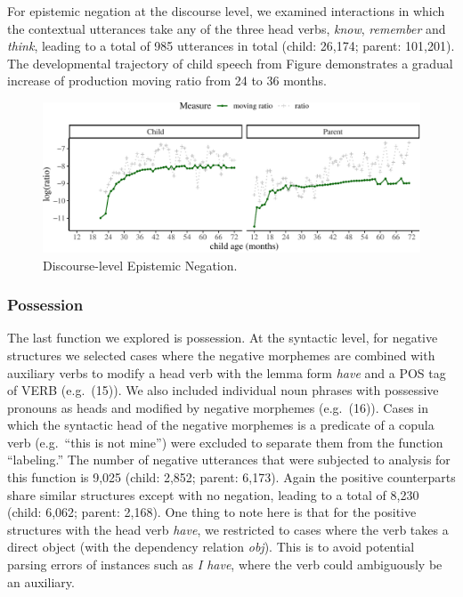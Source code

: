 \documentclass[
  english,
  man,floatsintext]{apa6}
\begin{document}
For epistemic negation at the discourse level, we examined interactions in which the contextual utterances take any of the three head verbs, \emph{know}, \emph{remember} and \emph{think}, leading to a total of 985 utterances in total (child: 26,174; parent: 101,201). The developmental trajectory of child speech from Figure demonstrates a gradual increase of production moving ratio from 24 to 36 months.

\begin{figure}[H]

{\centering \includegraphics{neg_construction_article_files/figure-latex/epistemicdiscourse-1} 

}

\caption{Discourse-level Epistemic Negation.}\label{fig:epistemicdiscourse}
\end{figure}

\hypertarget{possession}{%
\subsubsection{Possession}\label{possession}}

The last function we explored is possession. At the syntactic level, for negative structures we selected cases where the negative morphemes are combined with auxiliary verbs to modify a head verb with the lemma form \emph{have} and a POS tag of VERB (e.g.~(15)). We also included individual noun phrases with possessive pronouns as heads and modified by negative morphemes (e.g.~(16)). Cases in which the syntactic head of the negative morphemes is a predicate of a copula verb (e.g.~``this is not mine'') were excluded to separate them from the function ``labeling.'' The number of negative utterances that were subjected to analysis for this function is 9,025 (child: 2,852; parent: 6,173). Again the positive counterparts share similar structures except with no negation, leading to a total of 8,230 (child: 6,062; parent: 2,168). One thing to note here is that for the positive structures with the head verb \emph{have}, we restricted to cases where the verb takes a direct object (with the dependency relation \emph{obj}). This is to avoid potential parsing errors of instances such as \emph{I have}, where the verb could ambiguously be an auxiliary.
\end{document}
